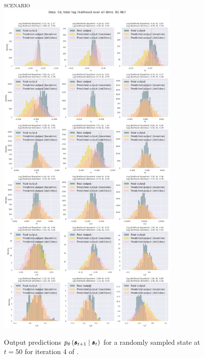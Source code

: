 \begin{figure}
    \centering
    \textsc{\MakeLowercase{\ws{} scenario}}\\
    \medskip
    \includegraphics[width=0.8\textwidth,trim=0 0 0 70,clip]{img/windyslope/output/output_distribution_step50_delta_all}
    \caption{Output predictions $\ptheta \protect\given*{\vns}{\vs}$ for a randomly sampled state at $t=50$ for iteration 4 of \dettostoc{}.}
    \label{fig:output_distribution_step50_dettostoc}
\end{figure}

